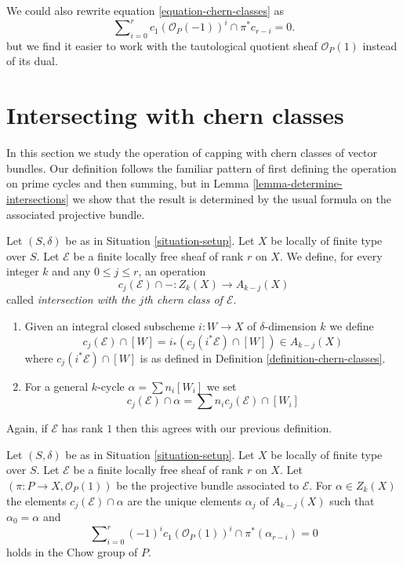 \begin{remark}
\label{remark-equation-signs}
We could also rewrite equation \ref{equation-chern-classes} as
\begin{equation}
\label{equation-signs}
\sum\nolimits_{i = 0}^r
c_1(\mathcal{O}_P(-1))^i \cap \pi^*c_{r - i}
= 0.
\end{equation}
but we find it easier to work with the tautological quotient
sheaf $\mathcal{O}_P(1)$ instead of
its dual.
\end{remark}




\section{Intersecting with chern classes}
\label{section-intersecting-chern-classes}

\noindent
In this section we study the operation of capping with chern
classes of vector bundles. Our definition follows the familiar
pattern of first defining the operation on prime cycles and then
summing, but in Lemma \ref{lemma-determine-intersections} we show
that the result is determined by the usual formula on the associated
projective bundle.

\begin{definition}
\label{definition-cap-chern-classes}
Let $(S, \delta)$ be as in Situation \ref{situation-setup}.
Let $X$ be locally of finite type over $S$.
Let $\mathcal{E}$ be a finite locally free sheaf of rank $r$ on $X$.
We define, for every integer $k$ and any $0 \leq j \leq r$,
an operation
$$
c_j(\mathcal{E}) \cap - : Z_k(X) \to A_{k - j}(X)
$$
called {\it intersection with the $j$th chern class of $\mathcal{E}$}.
\begin{enumerate}
\item Given an integral closed subscheme $i : W \to X$ of $\delta$-dimension
$k$ we define
$$
c_j(\mathcal{E}) \cap [W] = i_*(c_j({i^*\mathcal{E}}) \cap [W])
\in
A_{k - j}(X)
$$
where $c_j({i^*\mathcal{E}}) \cap [W]$ is as defined in
Definition \ref{definition-chern-classes}.
\item For a general $k$-cycle $\alpha = \sum n_i [W_i]$ we set
$$
c_j(\mathcal{E}) \cap \alpha = \sum n_i c_j(\mathcal{E}) \cap [W_i]
$$
\end{enumerate}
\end{definition}

\noindent
Again, if $\mathcal{E}$ has rank $1$ then this agrees with our
previous definition.

\begin{lemma}
\label{lemma-determine-intersections}
Let $(S, \delta)$ be as in Situation \ref{situation-setup}.
Let $X$ be locally of finite type over $S$.
Let $\mathcal{E}$ be a finite locally free sheaf of rank $r$ on $X$.
Let $(\pi : P \to X, \mathcal{O}_P(1))$ be the projective bundle
associated to $\mathcal{E}$.
For $\alpha \in Z_k(X)$ the elements
$c_j(\mathcal{E}) \cap \alpha$ are the unique elements
$\alpha_j$ of $A_{k - j}(X)$
such that $\alpha_0 = \alpha$ and
$$
\sum\nolimits_{i = 0}^r
(-1)^i c_1(\mathcal{O}_P(1))^i \cap
\pi^*(\alpha_{r - i}) = 0
$$
holds in the Chow group of $P$.
\end{lemma}

